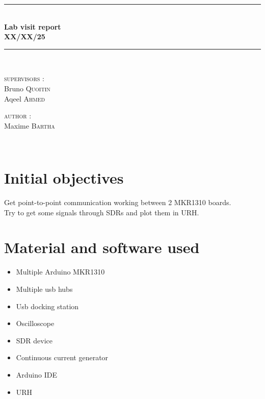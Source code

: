\documentclass[a4paper, 12pt]{article}
\newcommand{\HRule}{\rule{\linewidth}{0.3mm}}
\begin{document}
\begin{center}
\HRule \\[0.3cm]
{ \LARGE \bfseries Lab visit report \\[0.3cm]}
{ \LARGE \bfseries XX/XX/25 \\[0.1cm]} %
\HRule \\[1.5cm]

\begin{minipage}[t]{0.45\textwidth}
\begin{flushleft} \large
\textsc{supervisors :}\\
Bruno \textsc{Quoitin}\\
Aqeel \textsc{Ahmed}\\
\end{flushleft}

\end{minipage}
\begin{minipage}[t]{0.45\textwidth}
\begin{flushright} \large
\textsc{author :}\\
Maxime \textsc{Bartha}\\
\end{flushright}
\end{minipage}\\[2ex]
\end{center}


\section{Initial objectives}
Get point-to-point communication working between 2 MKR1310 boards.\\
Try to get some signals through SDRs and plot them in URH.

\section{Material and software used}

\begin{itemize}
  \item Multiple Arduino MKR1310
  \item Multiple usb hubs
  \item Usb docking station
  \item Oscilloscope
  \item SDR device
  \item Continuous current generator
  \item Arduino IDE
  \item URH
\end{itemize}
\end{document}
